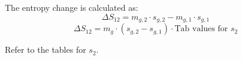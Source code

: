 The entropy change is calculated as:  
\[
\Delta S_{12} = m_{g,2} \cdot s_{g,2} - m_{g,1} \cdot s_{g,1}  
\]  
\[
\Delta S_{12} = m_{g} \cdot (s_{g,2} - s_{g,1}) \cdot \text{Tab values for } s_2  
\]  

Refer to the tables for \( s_2 \).